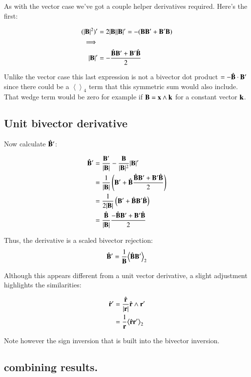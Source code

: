 \documentclass{article}      %
\newcommand{\Bcap}[0]{\hat{\BB}}
\newcommand{\Babs}[0]{\abs{\BB}}
\newcommand{\gpgrade}[2] {{\left\langle{{#1}}\right\rangle}_{#2}}
\newcommand{\gpgradetwo}[1] {\gpgrade{#1}{2}}
\newcommand{\gpgradefour}[1] {\gpgrade{#1}{4}}
\begin{document}
As with the vector case we've got a couple helper derivatives required.  Here's the first:

\begin{align*}
({\Babs^2})' &= 2\Babs\Babs' = -(\BB\BB' + \BB'\BB) \\
\implies \\
{\Babs}' &= -\frac{\Bcap\BB' + \BB'\Bcap}{2} \\
\end{align*}

Unlike the vector case this last expression is not a bivector dot product $= -\Bcap\cdot \BB'$ since there could be a
$\gpgradefour{}$ term that this symmetric sum would also include.
That wedge term would be zero for example if $\mathbf{B} = \mathbf{x} \wedge \mathbf{k}$ for a constant vector $\mathbf{k}$.

\subsection{ Unit bivector derivative }

Now calculate $\Bcap'$:

\begin{align*}
\Bcap'
&= \frac{\BB'}{\Babs} - \frac{\BB}{\Babs^2}\Babs' \\
&= \inv{\Babs}\left( \BB' + {\Bcap}\frac{\Bcap\BB' + \BB'\Bcap}{2} \right) \\
&= \inv{2\Babs}\left( \BB' + \Bcap\BB'\Bcap \right) \\
&= \frac{\Bcap}{\Babs}\frac{-\Bcap\BB' + \BB'\Bcap}{2} \\
\end{align*}

Thus, the derivative is a scaled bivector rejection:
\begin{equation}
\Bcap' = \inv{\BB}\gpgradetwo{\Bcap\BB'}
\end{equation}

Although this appears different from a unit vector derivative, a slight adjustment highlights the
similarities:

\begin{align*}
\rcap' 
&= \frac{\rcap}{\abs\Br}\rcap \wedge \Br' \\
&= \inv{\Br}\gpgradetwo{\rcap\Br'} \\
\end{align*}

Note however the sign inversion that is built into the bivector inversion.

\subsection{ combining results. }
\end{document}

